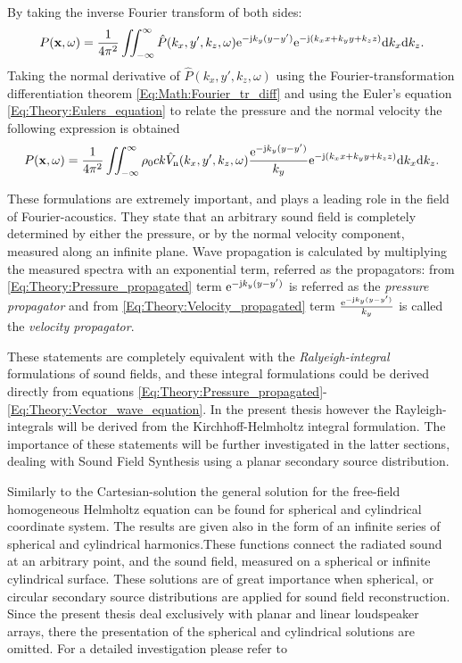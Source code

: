 By taking the inverse Fourier transform of both sides:
\begin{equation}
P(\mathbf{x},\omega) = \frac{1}{4\pi^2}\iint_{-\infty}^{\infty} \hat{P}(k_x,y',k_z,\omega) \mathrm{e}^{-\mathrm{j} k_y ( y - y' ) }  \mathrm{e}^{- \mathrm{j} \left( k_x x + k_y y + k_z z \right) }
\mathrm{d} k_x\mathrm{d} k_z.
\label{Eq:Theory:Pressure_propagated}
\end{equation}
Taking the normal derivative of $\hat{P}(k_x,y',k_z,\omega)$ using the Fourier-transformation differentiation theorem \eqref{Eq:Math:Fourier_tr_diff} and using the Euler's equation \eqref{Eq:Theory:Eulers_equation} to relate the pressure and the normal velocity the following expression is obtained
\begin{equation}
P(\mathbf{x},\omega) = \frac{1}{4\pi^2}\iint_{-\infty}^{\infty} \rho_0 c k\hat{V}_{\mathrm{n}}(k_x,y',k_z,\omega) \frac{\mathrm{e}^{-\mathrm{j} k_y ( y - y' ) } }{k_y} \mathrm{e}^{- \mathrm{j} \left( k_x x + k_y y + k_z z \right) }
\mathrm{d} k_x\mathrm{d} k_z.
\label{Eq:Theory:Velocity_propagated}
\end{equation}

These formulations are extremely important, and plays a leading role in the field of Fourier-acoustics. They state that an arbitrary sound field is completely determined by either the pressure, or by the normal velocity component, measured along an infinite plane. Wave propagation is calculated by multiplying the measured spectra with an exponential term, referred as the propagators: from \eqref{Eq:Theory:Pressure_propagated} term $\mathrm{e}^{-\mathrm{j} k_y ( y - y' ) }$ is referred as the \emph{pressure propagator} and from \eqref{Eq:Theory:Velocity_propagated} term $\frac{\mathrm{e}^{-\mathrm{j} k_y ( y - y' ) } }{k_y}$ is called the \emph{velocity propagator}.

These statements are completely equivalent with the \emph{Ralyeigh-integral} formulations of sound fields, and these integral formulations could be derived directly from equations \eqref{Eq:Theory:Pressure_propagated}-\eqref{Eq:Theory:Vector_wave_equation}. In the present thesis however the Rayleigh-integrals will be derived from the Kirchhoff-Helmholtz integral formulation.
The importance of these statements will be further investigated in the latter sections, dealing with Sound Field Synthesis using a planar secondary source distribution.

\vspace{3mm}
Similarly to the Cartesian-solution the general solution for the free-field homogeneous Helmholtz equation can be found for spherical and cylindrical coordinate system. The results are given also in the form of an infinite series of spherical and cylindrical harmonics.These functions connect the radiated sound at an arbitrary point, and the sound field, measured on a spherical or infinite cylindrical surface. These solutions are of great importance when spherical, or circular secondary source distributions are applied for sound field reconstruction. Since the present thesis deal exclusively with planar and linear loudspeaker arrays, there the presentation of the spherical and cylindrical solutions are omitted. For a detailed investigation
please refer to \cite{Williams1999, Zotter2009, Ahrens2012}

